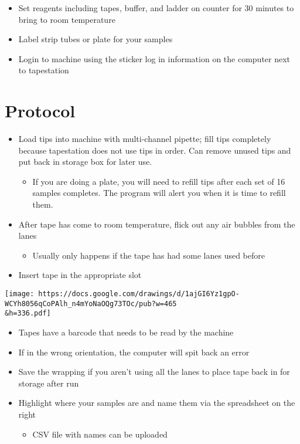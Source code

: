 \documentclass[
  letterpaper,
  DIV=11,
  numbers=noendperiod]{scrreprt}
\providecommand{\tightlist}{%
  \setlength{\itemsep}{0pt}\setlength{\parskip}{0pt}}\usepackage{longtable,booktabs,array}
\begin{document}

\begin{itemize}
\item
  Set reagents including tapes, buffer, and ladder on counter for 30
  minutes to bring to room temperature
\item
  Label strip tubes or plate for your samples
\item
  Login to machine using the sticker log in information on the computer
  next to tapestation
\end{itemize}

\hypertarget{protocol-6}{%
\section*{\texorpdfstring{\textbf{Protocol}}{Protocol}}\label{protocol-6}}


\begin{itemize}
\item
  Load tips into machine with multi-channel pipette; fill tips
  completely because tapestation does not use tips in order. Can remove
  unused tips and put back in storage box for later use.

  \begin{itemize}
  \tightlist
  \item
    If you are doing a plate, you will need to refill tips after each
    set of 16 samples completes. The program will alert you when it is
    time to refill them.
  \end{itemize}
\item
  After tape has come to room temperature, flick out any air bubbles
  from the lanes

  \begin{itemize}
  \tightlist
  \item
    Usually only happens if the tape has had some lanes used before
  \end{itemize}
\item
  Insert tape in the appropriate slot
\end{itemize}

\texttt{[image: https://docs.google.com/drawings/d/1ajGI6Yz1gpO-WCYh8056qCoPAlh\_n4mYoNaOQg73TOc/pub?w=465\\\&h=336.pdf]}

\begin{itemize}
\item
  Tapes have a barcode that needs to be read by the machine
\item
  If in the wrong orientation, the computer will spit back an error
\item
  Save the wrapping if you aren't using all the lanes to place tape back
  in for storage after run
\item
  Highlight where your samples are and name them via the spreadsheet on
  the right

  \begin{itemize}
  \tightlist
  \item
    CSV file with names can be uploaded
  \end{itemize}
\end{itemize}
\end{document}

